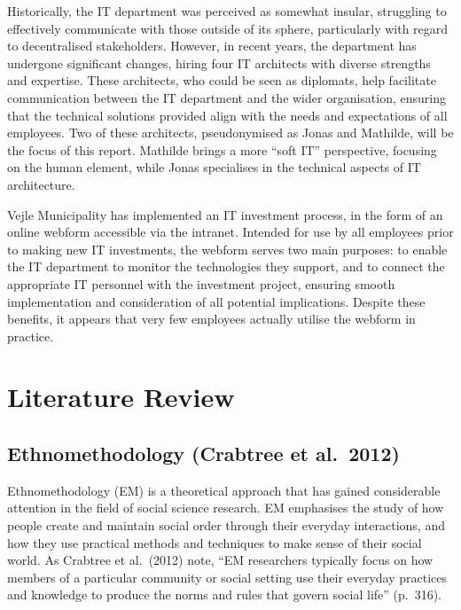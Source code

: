 \documentclass[
]{book}
\begin{document}
Historically, the IT department was perceived as somewhat insular, struggling to effectively communicate with those outside of its sphere, particularly with regard to decentralised stakeholders. However, in recent years, the department has undergone significant changes, hiring four IT architects with diverse strengths and expertise. These architects, who could be seen as diplomats, help facilitate communication between the IT department and the wider organisation, ensuring that the technical solutions provided align with the needs and expectations of all employees. Two of these architects, pseudonymised as Jonas and Mathilde, will be the focus of this report. Mathilde brings a more ``soft IT'' perspective, focusing on the human element, while Jonas specialises in the technical aspects of IT architecture.

Vejle Municipality has implemented an IT investment process, in the form of an online webform accessible via the intranet. Intended for use by all employees prior to making new IT investments, the webform serves two main purposes: to enable the IT department to monitor the technologies they support, and to connect the appropriate IT personnel with the investment project, ensuring smooth implementation and consideration of all potential implications. Despite these benefits, it appears that very few employees actually utilise the webform in practice.

\hypertarget{literature-review}{%
\section{Literature Review}\label{literature-review}}

\hypertarget{ethnomethodology-crabtree-et-al.-2012}{%
\subsection{Ethnomethodology (Crabtree et al.~2012)}\label{ethnomethodology-crabtree-et-al.-2012}}

Ethnomethodology (EM) is a theoretical approach that has gained considerable attention in the field of social science research. EM emphasises the study of how people create and maintain social order through their everyday interactions, and how they use practical methods and techniques to make sense of their social world. As Crabtree et al.~(2012) note, ``EM researchers typically focus on how members of a particular community or social setting use their everyday practices and knowledge to produce the norms and rules that govern social life'' (p.~316).
\end{document}

